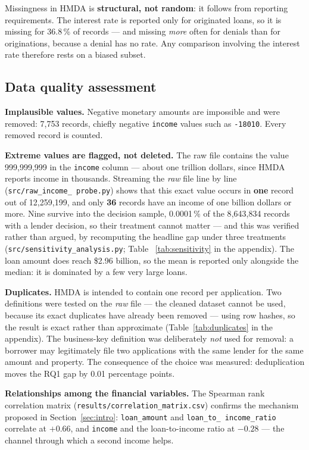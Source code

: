 \documentclass[sigconf,balance=false]{acmart}
\begin{document}
Missingness in HMDA is \textbf{structural, not random}: it follows from
reporting requirements. The interest rate is reported only for originated
loans, so it is missing for 36.8\,\% of records --- and missing \emph{more}
often for denials than for originations, because a denial has no rate. Any
comparison involving the interest rate therefore rests on a biased subset.

\subsection{Data quality assessment}\label{sec:results}

\textbf{Implausible values.} Negative monetary amounts are impossible and were
removed: 7{,}753 records, chiefly negative \texttt{income} values such as
\texttt{-18010}. Every removed record is counted.

\textbf{Extreme values are flagged, not deleted.} The raw file contains the
value 999{,}999{,}999 in the \texttt{income} column --- about one trillion
dollars, since HMDA reports income in thousands. Streaming the \emph{raw}
file line by line (\texttt{src/raw\_\allowbreak income\_\allowbreak
probe.py}) shows that this exact value occurs in \textbf{one} record out of
12{,}259{,}199, and only \textbf{36} records have an income of one billion
dollars or more. Nine survive into the decision sample, 0.0001\,\% of the
8{,}643{,}834 records with a lender decision, so their treatment cannot
matter --- and this was verified rather than argued, by recomputing the
headline gap under three treatments
(\texttt{src/sensitivity\_\allowbreak analysis.py}; Table~
\ref{tab:sensitivity} in the appendix). The loan amount does reach \$2.96
billion, so the mean is reported only alongside the median: it is dominated
by a few very large loans.

\textbf{Duplicates.} HMDA is intended to contain one record per application.
Two definitions were tested on the \emph{raw} file --- the cleaned dataset
cannot be used, because its exact duplicates have already been removed ---
using row hashes, so the result is exact rather than approximate
(Table~\ref{tab:duplicates} in the appendix). The business-key definition
was deliberately \emph{not} used for removal: a borrower may legitimately
file two applications with the same lender for the same amount and property.
The consequence of the choice was measured: deduplication moves the RQ1 gap
by 0.01 percentage points.

\textbf{Relationships among the financial variables.} The Spearman rank
correlation matrix (\texttt{results/correlation\_\allowbreak matrix.csv})
confirms the mechanism proposed in Section~\ref{sec:intro}:
\texttt{loan\_\allowbreak amount} and \texttt{loan\_\allowbreak to\_\allowbreak
income\_\allowbreak ratio} correlate at $+0.66$, and \texttt{income} and
the loan-to-income ratio at $-0.28$ --- the channel through which a second
income helps.
\end{document}
